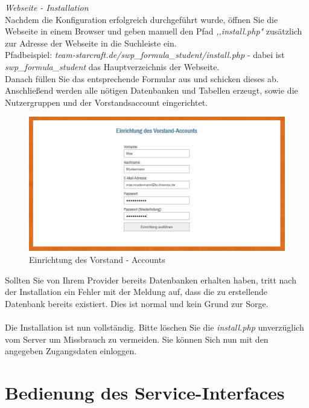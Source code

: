 \documentclass[fontsize = 12pt, paper = a4]{scrreprt}
\begin{document}
\textit{Webseite - Installation} \\

Nachdem die Konfiguration erfolgreich durchgeführt wurde, öffnen Sie die Webseite in einem Browser und geben manuell den Pfad \textit{,,install.php"} zusätzlich zur Adresse der Webseite in die Suchleiste ein.\\
Pfadbeispiel: \textit{team-starcraft.de/swp\_formula\_student/install.php} - dabei ist \textit{swp\_formula\_student} das Hauptverzeichnis der Webseite. \\
 Danach füllen Sie das entsprechende Formular aus und schicken dieses ab. 
 Anschließend werden alle nötigen Datenbanken und Tabellen erzeugt, sowie die Nutzergruppen und der Vorstandsaccount eingerichtet.

\begin{figure}[h]
\centering
\includegraphics[scale = 0.50]{install}
\caption[Einrichtung des Vorstand - Accounts]{Einrichtung des Vorstand - Accounts}
\label{installvorstand}
\end{figure} 


Sollten Sie von Ihrem Provider bereits Datenbanken erhalten haben, tritt nach der Installation ein Fehler mit der Meldung auf, dass die zu erstellende Datenbank bereits existiert. Dies ist normal und kein Grund zur Sorge. \\ \\

Die Installation ist nun vollständig. Bitte löschen Sie die \textit{install.php} unverzüglich vom Server um Missbrauch zu vermeiden. Sie können Sich nun mit den angegeben Zugangsdaten einloggen.





\chapter{Bedienung des Service-Interfaces}
\end{document}
